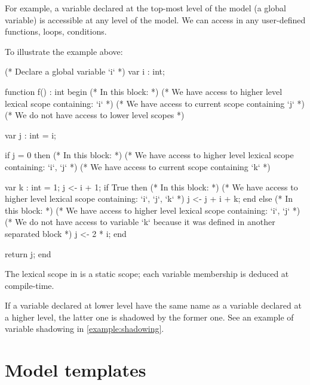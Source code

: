 For example, a variable  declared at the top-most level of the model (a global variable) is accessible at any level of the model.
We can access  in any user-defined functions, loops, conditions.

\begin{example}
	To illustrate the example above:

\begin{IMITATORmodel}
(* Declare a global variable `i` *)
var i : int;

function f() : int
begin
	(* In this block: *)
	(* We have access to higher level lexical scope containing: `i` *)
	(* We have access to current scope containing `j` *)
	(* We do not have access to lower level scopes *)

	var j : int = i;

	if j = 0 then
		(* In this block: *)
		(* We have access to higher level lexical scope containing: `i`, `j` *)
		(* We have access to current scope containing `k` *)

		var k : int = 1;
		j <- i + 1;
		if True then
			(* In this block: *)
			(* We have access to higher level lexical scope containing: `i`, `j`, `k` *)
			j <- j + i + k;
		end
	else
		(* In this block: *)
		(* We have access to higher level lexical scope containing: `i`, `j` *)
		(* We do not have access to variable `k` because it was defined in another separated block *)
		j <- 2 * i;
	end

	return j;
end
\end{IMITATORmodel}
\end{example}

The lexical scope in \imitator{} is a static scope; each variable membership is deduced at compile-time.


If a variable declared at lower level have the same name as a variable declared at a higher level, the latter one is shadowed by the former one.
See an example of variable shadowing in \cref{example:shadowing}.


\section{Model templates}\label{section:templates}

